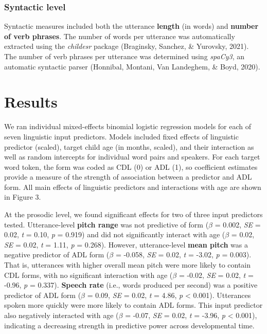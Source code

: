 \documentclass[10pt, letterpaper]{article}
\begin{document}
\hypertarget{syntactic-level}{%
\subsubsection{Syntactic level}\label{syntactic-level}}

Syntactic measures included both the utterance \textbf{length} (in
words) and \textbf{number of verb phrases}. The number of words per
utterance was automatically extracted using the \emph{childesr} package
(Braginsky, Sanchez, \& Yurovsky, 2021). The number of verb phrases per
utterance was determined using \emph{spaCy3}, an automatic syntactic
parser (Honnibal, Montani, Van Landeghem, \& Boyd, 2020).

\hypertarget{results-1}{%
\section{Results}\label{results-1}}

We ran individual mixed-effects binomial logistic regression models for
each of seven linguistic input predictors. Models included fixed effects
of linguistic predictor (scaled), target child age (in months, scaled),
and their interaction as well as random intercepts for individual word
pairs and speakers. For each target word token, the form was coded as
CDL (0) or ADL (1), so coefficient estimates provide a measure of the
strength of association between a predictor and ADL form. All main
effects of linguistic predictors and interactions with age are shown in
Figure 3.

At the prosodic level, we found significant effects for two of three
input predictors tested. Utterance-level \textbf{pitch range} was not
predictive of form (\(\beta\) = 0.002, \emph{SE} = 0.02, \emph{t} =
0.10, \emph{p} = 0.919) and did not significantly interact with age
(\(\beta\) = 0.02, \emph{SE} = 0.02, \emph{t} = 1.11, \emph{p} = 0.268).
However, utterance-level \textbf{mean pitch} was a negative predictor of
ADL form (\(\beta\) = -0.058, \emph{SE} = 0.02, \emph{t} = -3.02,
\emph{p} = 0.003). That is, utterances with higher overall mean pitch
were more likely to contain CDL forms, with no significant interaction
with age (\(\beta\) = -0.02, \emph{SE} = 0.02, \emph{t} = -0.96,
\emph{p} = 0.337). \textbf{Speech rate} (i.e., words produced per
second) was a positive predictor of ADL form (\(\beta\) = 0.09,
\emph{SE} = 0.02, \emph{t} = 4.86, \emph{p} \textless{} 0.001).
Utterances spoken more quickly were more likely to contain ADL forms.
This input predictor also negatively interacted with age (\(\beta\) =
-0.07, \emph{SE} = 0.02, \emph{t} = -3.96, \emph{p} \textless{} 0.001),
indicating a decreasing strength in predictive power across
developmental time.
\end{document}
